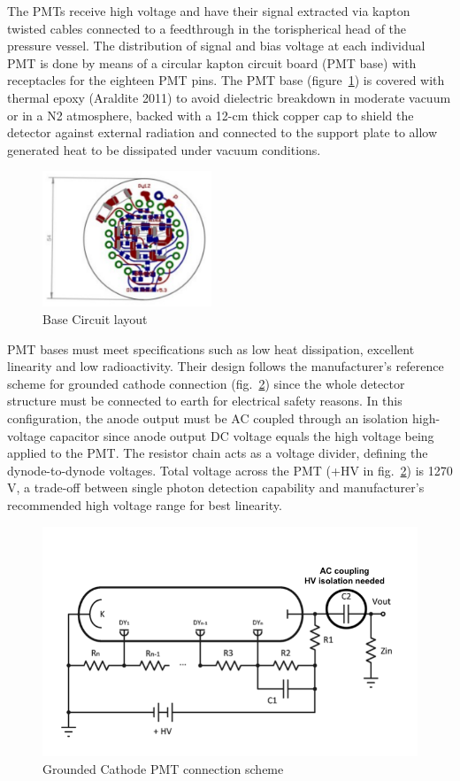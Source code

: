 \documentclass[a4paper, 10pt, oneside, twocolumn, 3p]{elsarticle}
\begin{document}
\par The PMTs receive high voltage and have their signal extracted via kapton twisted cables connected to a feedthrough in the torispherical head of the pressure vessel. The distribution of signal and bias voltage at each individual PMT is done by means of a circular kapton circuit board (PMT base) with receptacles for the eighteen PMT pins. The PMT base (figure~\ref{fig:7C_layout}) is covered with thermal epoxy (Araldite 2011\textregistered) to avoid dielectric breakdown in moderate vacuum or in a N2 atmosphere, backed with a 12-cm thick copper cap to shield the detector against external radiation and connected to the support plate to allow generated heat to be dissipated under vacuum conditions.

\begin{figure}
  \begin{center}
    \includegraphics[width=0.45\textwidth]{./figures/7C_layout.pdf}
    \caption{Base Circuit layout}
    \label{fig:7C_layout}
  \end{center}
\end{figure}


\par PMT bases must meet specifications such as low heat dissipation, excellent linearity and low radioactivity. Their design follows the manufacturer's reference scheme for grounded cathode connection (fig.~\ref{fig:grounded_cathode}) since the whole detector structure must be connected to earth for electrical safety reasons. In this configuration, the anode output must be AC coupled through an isolation high-voltage capacitor since anode output DC voltage equals the high voltage being applied to the PMT. The resistor chain acts as a voltage divider, defining the dynode-to-dynode voltages. Total voltage across the PMT (+HV in fig.~\ref{fig:grounded_cathode}) is 1270 V, a trade-off between single photon detection capability and manufacturer's recommended high voltage range for best linearity.

\begin{figure} [H]
	\begin{center}
		\includegraphics[width=.4\textwidth]{./figures/AC_diagram.png}
		\caption{Grounded Cathode PMT connection scheme}
		\label{fig:grounded_cathode}
	\end{center}
\end{figure}
\end{document}
